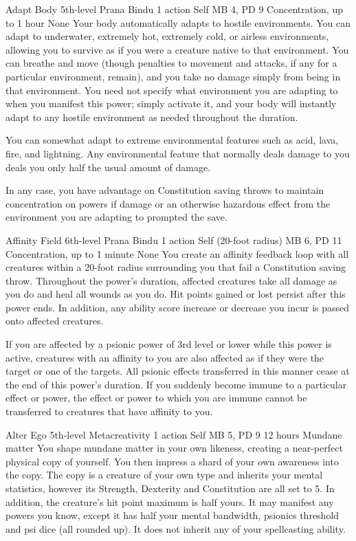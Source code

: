 \DndPowerHeader%
    {Adapt Body\label{pwr:adapt_body}}
    {5th-level Prana Bindu}
    {1 action}
    {Self}
    {MB 4, PD 9}
    {Concentration, up to 1 hour}
    {None}
Your body automatically adapts to hostile
environments. You can adapt to underwater, extremely hot,
extremely cold, or airless environments, allowing you to survive
as if you were a creature native to that environment. You
can breathe and move (though penalties to movement and attacks,
if any for a particular environment, remain), and you take
no damage simply from being in that environment. You need
not specify what environment you are adapting to when you
manifest this power; simply activate it, and your body will
instantly adapt to any hostile environment as needed throughout
the duration.

You can somewhat adapt to extreme environmental features such
as acid, lava, fire, and lightning. Any environmental feature
that normally deals damage to you deals
you only half the usual amount of damage.

In any case, you have advantage on Constitution saving throws
to maintain concentration on powers if damage or an otherwise
hazardous effect from the environment you are adapting to
prompted the save.

\DndPowerHeader%
    {Affinity Field\label{pwr:affinity_field}}
    {6th-level Prana Bindu}
    {1 action}
    {Self (20-foot radius)}
    {MB 6, PD 11}
    {Concentration, up to 1 minute}
    {None}
You create an affinity feedback loop with all creatures within a 20-foot
radius surrounding you that fail a Constitution saving throw.
Throughout the power's duration, affected creatures take all damage
as you do and heal all wounds as you do.
Hit points gained or lost persist after this power ends.
In addition, any ability score increase or decrease you incur is passed
onto affected creatures.

If you are affected by a psionic power of 3rd level or lower while this power is active,
creatures with an affinity to you are also affected as if they were the target
or one of the targets.
All psionic effects transferred in this manner cease
at the end of this power's duration.
If you suddenly become immune to a particular effect or power,
the effect or power to which you are immune cannot be transferred
to creatures that have affinity to you.

\DndPowerHeader%
    {Alter Ego\label{pwr:alter_ego}}
    {5th-level Metacreativity}
    {1 action}
    {Self}
    {MB 5, PD 9}
    {12 hours}
    {Mundane matter}
You shape mundane matter in your own likeness, creating a
near-perfect physical copy of yourself.
You then impress a shard of your own awareness into the copy.
The copy is a creature of your own type and inherits your mental statistics,
however its Strength, Dexterity and Constitution are all set to 5.
In addition, the creature's hit point maximum is half yours.
It may manifest any powers you know, except it has half your
mental bandwidth, psionics threshold and psi dice (all rounded up).
It does not inherit any of your spellcasting ability.


